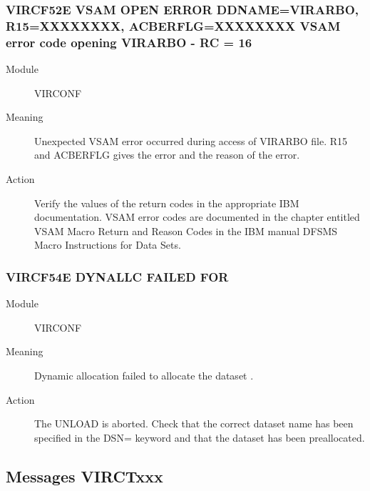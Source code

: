 \documentclass[letterpaper,10pt,english]{sphinxmanual}
\begin{document}
\subsubsection{VIRCF52E VSAM OPEN ERROR DDNAME=VIRARBO, R15=XXXXXXXX, ACBERFLG=XXXXXXXX VSAM error code opening VIRARBO - RC = 16}
\label{\detokenize{messages:vircf52e-vsam-open-error-ddname-virarbo-r15-xxxxxxxx-acberflg-xxxxxxxx-vsam-error-code-opening-virarbo-rc-16}}\begin{description}
\item[{Module}] \leavevmode
VIRCONF

\item[{Meaning}] \leavevmode
Unexpected VSAM error occurred during access of VIRARBO file. R15 and ACBERFLG gives the error and the reason of the error.

\item[{Action}] \leavevmode
Verify the values of the return codes in the appropriate IBM documentation. VSAM error codes are documented in the chapter entitled VSAM Macro Return and Reason Codes in the IBM manual DFSMS Macro Instructions for Data Sets.

\end{description}


\subsubsection{VIRCF54E DYNALLC FAILED FOR }
\label{\detokenize{messages:vircf54e-dynallc-failed-for-dsname}}\begin{description}
\item[{Module}] \leavevmode
VIRCONF

\item[{Meaning}] \leavevmode
Dynamic allocation failed to allocate the dataset .

\item[{Action}] \leavevmode
The UNLOAD is aborted. Check that the correct dataset name has been specified in the DSN= keyword and that the dataset has been preallocated.

\end{description}


\subsection{Messages VIRCTxxx}
\label{\detokenize{messages:messages-virctxxx}}
\end{document}
